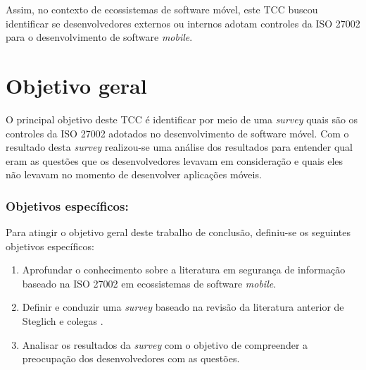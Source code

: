 Assim, no contexto de ecossistemas de software móvel, este TCC  buscou identificar se desenvolvedores externos ou internos adotam controles da ISO 27002 para o desenvolvimento de software \textit{mobile}.



\section{Objetivo geral}

O principal objetivo deste TCC é identificar por meio de uma \textit{survey} quais são os controles da ISO 27002 adotados no desenvolvimento de software móvel. Com o resultado desta \textit{survey} realizou-se uma análise dos resultados para entender qual eram as questões que os desenvolvedores levavam em consideração e quais eles não levavam no momento de desenvolver aplicações móveis.

 
\subsubsection{\textbf{Objetivos específicos:}}

Para atingir o objetivo geral deste trabalho de conclusão, definiu-se os seguintes objetivos específicos:

\begin{enumerate}
    \item Aprofundar o conhecimento sobre a literatura em segurança de informação baseado na ISO 27002 em ecossistemas de software \textit{mobile}.
    
    \item Definir e conduzir uma \textit{survey} baseado na revisão da literatura anterior de Steglich e colegas \cite{caio2019}.
    
    \item Analisar os resultados da \textit{survey} com o objetivo de compreender a preocupação dos desenvolvedores com as questões.
    
    
\end{enumerate}


      



